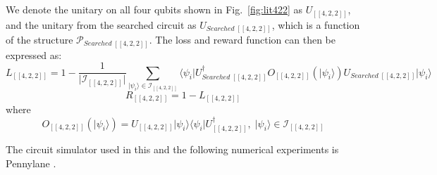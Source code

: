 \documentclass[a4paper,onecolumn,11pt]{quantumarticle}
\begin{document}
We denote the unitary on all four qubits shown in Fig.~\ref{fig:lit422} as $U_{[[4,2,2]]}$, and the unitary from the searched circuit as $U_{Searched\;[[4,2,2]]}$, which is a function of the structure $\mathcal{P}_{Searched\;[[4,2,2]]}$. The loss and reward function can then be expressed as:
\begin{equation}
    L_{[[4,2,2]]} = 1-\frac{1}{\vert \mathcal{I}_{[[4,2,2]]} \vert}\sum_{\vert \psi_i\rangle\in  \mathcal{I}_{[[4,2,2]]}} \langle \psi_i \vert U_{Searched\;[[4,2,2]]}^{\dagger} O_{[[4,2,2]]}(\vert \psi_i\rangle)  U_{Searched\;[[4,2,2]]} \vert \psi_i\rangle
\end{equation}
\begin{equation}
    R_{[[4,2,2]]} = 1-L_{[[4,2,2]]}
\end{equation}
where
\begin{equation}
    O_{[[4,2,2]]}(\vert \psi_i\rangle) = U_{[[4,2,2]]} \vert \psi_i\rangle \langle \psi_i \vert U_{[[4,2,2]]}^{\dagger},\; \vert \psi_i\rangle\in  \mathcal{I}_{[[4,2,2]]}
\end{equation}



The circuit simulator used in this and the following numerical experiments is Pennylane \cite{bergholm2020pennylane}.
\end{document}
